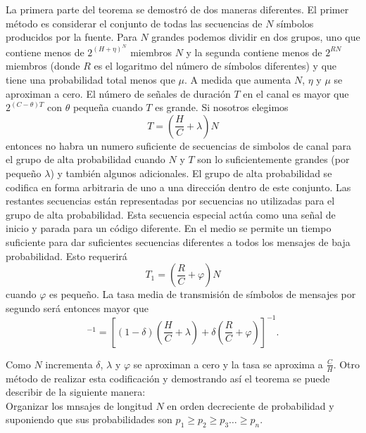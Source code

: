 La primera parte del teorema se demostr\'o de dos maneras diferentes.
El primer m\'etodo es considerar el conjunto de todas las secuencias
de $N$ s\'imbolos producidos por la fuente. Para $N$ grandes podemos
dividir en dos grupos, uno que contiene menos de $2^{(H+\eta)^{N}}$
miembros $N$ y la segunda contiene menos de $2^{RN}$ miembros (donde
$R$ es el logaritmo del n\'umero de s\'imbolos diferentes) y que tiene
una probabilidad total menos que $\mu$. A medida que aumenta $N$,
$\eta$ y $\mu$ se aproximan a cero. El n\'umero de se\~{n}ales de
duraci\'on $T$ en el canal es mayor que $2^{(C-\theta)T}$ con $\theta$
peque\~{n}a cuando $T$ es grande. Si nosotros elegimos
\begin{equation}
T =(\frac{H}{C}+\lambda)N
\end{equation}
entonces no habra un numero suficiente de secuencias de simbolos de
canal para el grupo de alta probabilidad cuando $N$ y $T$ son lo
suficientemente grandes (por peque\~{n}o $\lambda$) y tambi\'en
algunos adicionales. El grupo de alta probabilidad se codifica en
forma arbitraria de uno a una direcci\'on dentro de este conjunto. Las
restantes secuencias est\'an representadas por secuencias no
utilizadas para el grupo de alta probabilidad. Esta secuencia especial
act\'ua como una se\~{n}al de inicio y parada para un c\'odigo
diferente. En el medio se permite un tiempo suficiente para dar
suficientes secuencias diferentes a todos los mensajes de baja
probabilidad. Esto requerir\'a
\begin{equation}
T_{1} = (\frac{R}{C} + \varphi)N
\end{equation}
cuando $\varphi$ es peque\~{n}o. La tasa media de transmisi\'on de s\'imbolos de mensajes por segundo ser\'a entonces 
mayor que
\begin{equation}
[(1-\delta)\frac{T}{N} + \delta\frac{T_{1}}{N}]^{-1} = [(1-\delta) (\frac{H}{C} + \lambda) + \delta(\frac{R}{C} + \varphi)]^{-1}.
\end{equation}

Como $N$ incrementa $\delta$, $\lambda$ y $\varphi$ se aproximan a cero y la tasa se aproxima a  $\frac{C}{H}$.
Otro m\'etodo de realizar esta codificaci\'on y demostrando as\'i el teorema se puede describir de la siguiente manera:\\
Organizar los mnsajes de longitud $N$ en orden decreciente de probabilidad y suponiendo que sus probabilidades 
son $p_{1}\geq p_{2}\geq p_{3} \ldots \geq p_{n}$.

